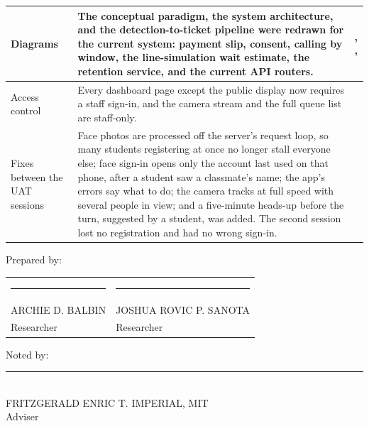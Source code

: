 \documentclass[12pt,letterpaper]{article}
\newcommand{\pg}[1]{\large #1}
\begin{document}
\begin{longtable}{|>{\raggedright\arraybackslash}m{4.2cm}|>{\raggedright\arraybackslash}m{6.9cm}|P|}
Diagrams
&
The conceptual paradigm, the system architecture, and the
detection-to-ticket pipeline were redrawn for the current system:
payment slip, consent, calling by window, the line-simulation wait
estimate, the retention service, and the current API routers.
&
\pg{\pageref{fig:conceptual-framework}, \pageref{fig:system-architecture}, \pageref{fig:detection-ticket-pipeline}} \\ \hline

Access control
&
Every dashboard page except the public display now requires a staff
sign-in, and the camera stream and the full queue list are staff-only.
&
\pg{\pageref{cr:presentation}} \\ \hline

Fixes between the UAT sessions
&
Face photos are processed off the server's request loop, so many
students registering at once no longer stall everyone else; face
sign-in opens only the account last used on that phone, after a student
saw a classmate's name; the app's errors say what to do; the camera
tracks at full speed with several people in view; and a five-minute
heads-up before the turn, suggested by a student, was added. The second
session lost no registration and had no wrong sign-in.
&
\pg{\pageref{subsec:uat-fixes}} \\ \hline

\end{longtable}

\normalsize
\vspace{2em}
\noindent Prepared by:

\vspace{2.5em}
\begin{tabular}{@{}p{7cm}p{7cm}@{}}
\rule{6cm}{0.4pt} & \rule{6cm}{0.4pt} \\
ARCHIE D. BALBIN & JOSHUA ROVIC P. SANOTA \\
Researcher & Researcher \\
\end{tabular}

\vspace{2em}
\noindent Noted by:

\vspace{2.5em}
\noindent\rule{6cm}{0.4pt}\\
FRITZGERALD ENRIC T. IMPERIAL, MIT\\
Adviser
\end{document}
